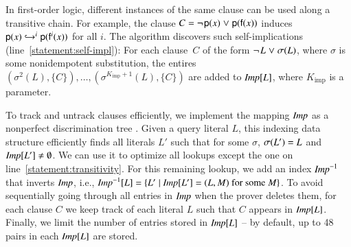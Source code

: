 In first-order logic, different instances of the same clause can
be used along a transitive chain. For example, the clause $C =
\negpredlit{\cst{p}(x)} \cor \pospredlit{\cst{p}(\cst{f}(x))}$ induces $\cst{p}(x) \bigfimpl{M}^i \cst{p}(\cst{f}^i(x))$ for all $i$.
The algorithm discovers such self-implications (line~\ref{statement:self-impl}): For
each clause~$C$ of the form $\neglit{L} \cor \sigma(L)$, where $\sigma$ is
some nonidempotent substitution, the entires $(\sigma^2(L), \{C\}),\allowbreak
\ldots,\allowbreak (\sigma^{K_{\mathrm{imp}} + 1}(L), \{C\})$ are added to
$\impmap[L]$, where $K_{\mathrm{imp}}$ is a parameter. 

\newcommand{\concl}{\ensuremath{\impmap^{-1}}}

To track and untrack clauses efficiently, we implement the mapping $\impmap$ as a
nonperfect discrimination tree \cite{rsv-2001-term-indexing}. Given a query
literal $L$, this indexing data structure efficiently finds all literals $L'$ such that
for some $\sigma$, $\sigmaterm{L'} = L$ and $\impmap[L'] \not= \emptyset$. We can use
it to optimize all lookups except the one on line~\ref{statement:transitivity}.
For this remaining lookup, we add an
index \concl{} that inverts $\impmap$, i.e., $\concl[L] = \{ L' \mid
\impmap[L'] = (L,M) \text{ for some } M \}$. To avoid sequentially going through
all entries in $\impmap$ when the prover deletes them, for each clause $C$
we keep track of each literal $L$ such that $C$ appears in $\impmap[L]$.
Finally, we limit the number of entries stored in $\impmap[L]$ -- by default,
up to 48 pairs in each $\impmap[L]$ are stored.

